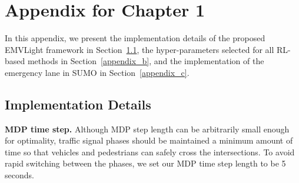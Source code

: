 \chapter{Appendix for Chapter 1}
In this appendix, we present the implementation details of the proposed EMVLight framework in Section~\ref{appendix_a}, the hyper-parameters selected for all RL-based methods in Section~\ref{appendix_b}, and the implementation of the emergency lane in SUMO in Section~\ref{appendix_c}.

\section{Implementation Details}\label{appendix_a}
\textbf{MDP time step.} Although MDP step length can be arbitrarily small enough for optimality, traffic signal phases should be maintained a minimum amount of time so that vehicles and pedestrians can safely cross the intersections. To avoid rapid switching between the phases, we set our MDP time step length to be 5 seconds.


